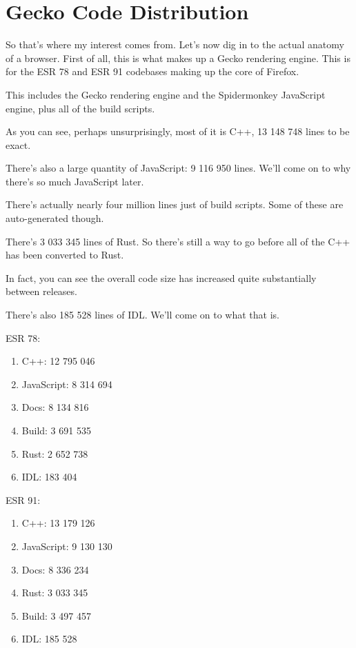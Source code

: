 \documentclass{article}
\begin{document}

\section{Gecko Code Distribution}

So that's where my interest comes from. Let's now dig in to the actual anatomy of a browser. First of all, this is what makes up a Gecko rendering engine. This is for the ESR 78 and  ESR 91 codebases making up the core of Firefox.

This includes the Gecko rendering engine and the Spidermonkey JavaScript engine, plus all of the build scripts.

As you can see, perhaps unsurprisingly, most of it is C++, 13 148 748 lines to be exact.

There's also a large quantity of JavaScript: 9 116 950 lines. We'll come on to why there's so much JavaScript later.

There's actually nearly four million lines just of build scripts. Some of these are auto-generated though.

There's 3 033 345 lines of Rust. So there's still a way to go before all of the C++ has been converted to Rust.

In fact, you can see the overall code size has increased quite substantially between releases.

There's also 185 528 lines of IDL. We'll come on to what that is.

ESR 78:
\begin{enumerate}
\item C++: 12 795 046
\item JavaScript: 8 314 694
\item Docs: 8 134 816
\item Build: 3 691 535
\item Rust: 2 652 738
\item IDL: 183 404
\end{enumerate}

ESR 91:
\begin{enumerate}
\item C++: 13 179 126
\item JavaScript: 9 130 130
\item Docs: 8 336 234
\item Rust: 3 033 345
\item Build: 3 497 457
\item IDL: 185 528
\end{enumerate}
\end{document}
